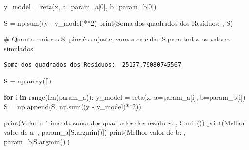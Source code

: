 \documentclass[
  letterpaper,
  DIV=11,
  numbers=noendperiod]{scrreprt}
\newenvironment{Shaded}{\begin{snugshade}}{\end{snugshade}}
\newcommand{\BuiltInTok}[1]{\textcolor[rgb]{0.00,0.23,0.31}{#1}}
\newcommand{\CommentTok}[1]{\textcolor[rgb]{0.37,0.37,0.37}{#1}}
\newcommand{\ControlFlowTok}[1]{\textcolor[rgb]{0.00,0.23,0.31}{\textbf{#1}}}
\newcommand{\DecValTok}[1]{\textcolor[rgb]{0.68,0.00,0.00}{#1}}
\newcommand{\KeywordTok}[1]{\textcolor[rgb]{0.00,0.23,0.31}{\textbf{#1}}}
\newcommand{\NormalTok}[1]{\textcolor[rgb]{0.00,0.23,0.31}{#1}}
\newcommand{\OperatorTok}[1]{\textcolor[rgb]{0.37,0.37,0.37}{#1}}
\newcommand{\StringTok}[1]{\textcolor[rgb]{0.13,0.47,0.30}{#1}}
\begin{document}
\begin{Shaded}
\begin{Highlighting}[]
\NormalTok{y\_model }\OperatorTok{=}\NormalTok{ reta(x, a}\OperatorTok{=}\NormalTok{param\_a[}\DecValTok{0}\NormalTok{], b}\OperatorTok{=}\NormalTok{param\_b[}\DecValTok{0}\NormalTok{])}

\NormalTok{S }\OperatorTok{=}\NormalTok{ np.}\BuiltInTok{sum}\NormalTok{((y }\OperatorTok{{-}}\NormalTok{ y\_model)}\OperatorTok{**}\DecValTok{2}\NormalTok{)}
\BuiltInTok{print}\NormalTok{(}\StringTok{\textquotesingle{}Soma dos quadrados dos Resíduos: \textquotesingle{}}\NormalTok{, S)}

\CommentTok{\# Quanto maior o S, pior é o ajuste, vamos calcular S para todos os valores simulados}
\end{Highlighting}
\end{Shaded}

\begin{verbatim}
Soma dos quadrados dos Resíduos:  25157.79080745567
\end{verbatim}

\begin{Shaded}
\begin{Highlighting}[]
\NormalTok{S }\OperatorTok{=}\NormalTok{ np.array([])}

\ControlFlowTok{for}\NormalTok{ i }\KeywordTok{in} \BuiltInTok{range}\NormalTok{(}\BuiltInTok{len}\NormalTok{(param\_a)):}
\NormalTok{    y\_model }\OperatorTok{=}\NormalTok{ reta(x, a}\OperatorTok{=}\NormalTok{param\_a[i], b}\OperatorTok{=}\NormalTok{param\_b[i])}
\NormalTok{    S }\OperatorTok{=}\NormalTok{ np.append(S, np.}\BuiltInTok{sum}\NormalTok{((y }\OperatorTok{{-}}\NormalTok{ y\_model)}\OperatorTok{**}\DecValTok{2}\NormalTok{))}
\end{Highlighting}
\end{Shaded}

\begin{Shaded}
\begin{Highlighting}[]
\BuiltInTok{print}\NormalTok{(}\StringTok{\textquotesingle{}Valor mínimo da soma dos quadrados dos resíduos: \textquotesingle{}}\NormalTok{, S.}\BuiltInTok{min}\NormalTok{())}
\BuiltInTok{print}\NormalTok{(}\StringTok{\textquotesingle{}Melhor valor de a: \textquotesingle{}}\NormalTok{, param\_a[S.argmin()])}
\BuiltInTok{print}\NormalTok{(}\StringTok{\textquotesingle{}Melhor valor de b: \textquotesingle{}}\NormalTok{, param\_b[S.argmin()])}
\end{Highlighting}
\end{Shaded}
\end{document}
